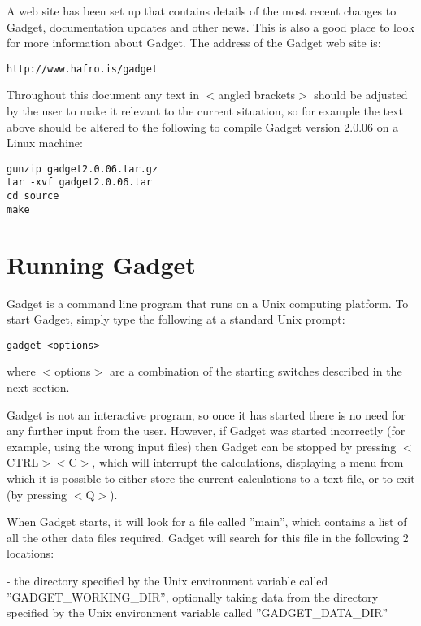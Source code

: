 \documentclass [a4paper, 10pt]{book}
\begin{document}
\bigskip
A web site has been set up that contains details of the most recent changes to Gadget, documentation updates and other news.  This is also a good place to look for more information about Gadget.  The address of the Gadget web site is:

{\small\begin{verbatim}
http://www.hafro.is/gadget
\end{verbatim}}

Throughout this document any text in $<$angled brackets$>$ should be adjusted by the user to make it relevant to the current situation, so for example the text above should be altered to the following to compile Gadget version 2.0.06 on a Linux machine:

{\small\begin{verbatim}
gunzip gadget2.0.06.tar.gz
tar -xvf gadget2.0.06.tar
cd source
make
\end{verbatim}}

\section{Running Gadget}\label{sec:runninggadget}
Gadget is a command line program that runs on a Unix computing platform.  To start Gadget, simply type the following at a standard Unix prompt:

{\small\begin{verbatim}
gadget <options>
\end{verbatim}}

where $<$options$>$ are a combination of the starting switches described in the next section.

\bigskip
Gadget is not an interactive program, so once it has started there is no need for any further input from the user.  However, if Gadget was started incorrectly (for example, using the wrong input files) then Gadget can be stopped by pressing $<$CTRL$>$$<$C$>$, which will interrupt the calculations, displaying a menu from which it is possible to either store the current calculations to a text file, or to exit (by pressing $<$Q$>$).

\bigskip
When Gadget starts, it will look for a file called ''main'', which contains a list of all the other data files required.  Gadget will search for this file in the following 2 locations:

 - the directory specified by the Unix environment variable called ''GADGET\_WORKING\_DIR'', optionally taking data from the directory specified by the Unix environment variable called ''GADGET\_DATA\_DIR''
\end{document}
